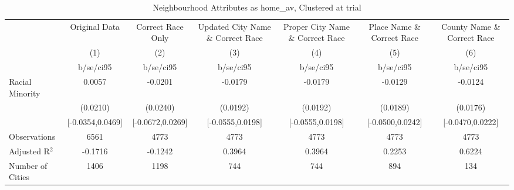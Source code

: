 \documentclass{article}
\begin{document}
\begin{table}[htbp]\centering
\def\sym#1{\ifmmode^{#1}\else\(^{#1}\)\fi}
\caption{Neighbourhood Attributes as home\_av, Clustered at trial}
\begin{tabular}{l*{6}{c}}
\toprule
                    &\multicolumn{1}{c}{Original Data}&\multicolumn{1}{c}{Correct Race Only}&\multicolumn{1}{c}{Updated City Name \& Correct Race}&\multicolumn{1}{c}{Proper City Name \& Correct Race}&\multicolumn{1}{c}{Place Name \& Correct Race}&\multicolumn{1}{c}{County Name \& Correct Race}\\\cmidrule(lr){2-2}\cmidrule(lr){3-3}\cmidrule(lr){4-4}\cmidrule(lr){5-5}\cmidrule(lr){6-6}\cmidrule(lr){7-7}
                    &\multicolumn{1}{c}{(1)}   &\multicolumn{1}{c}{(2)}   &\multicolumn{1}{c}{(3)}   &\multicolumn{1}{c}{(4)}   &\multicolumn{1}{c}{(5)}   &\multicolumn{1}{c}{(6)}   \\
                    &   b/se/ci95   &   b/se/ci95   &   b/se/ci95   &   b/se/ci95   &   b/se/ci95   &   b/se/ci95   \\
\midrule
Racial Minority     &      0.0057   &     -0.0201   &     -0.0179   &     -0.0179   &     -0.0129   &     -0.0124   \\
                    &    (0.0210)   &    (0.0240)   &    (0.0192)   &    (0.0192)   &    (0.0189)   &    (0.0176)   \\
                    &[-0.0354,0.0469]   &[-0.0672,0.0269]   &[-0.0555,0.0198]   &[-0.0555,0.0198]   &[-0.0500,0.0242]   &[-0.0470,0.0222]   \\
\midrule
Observations        &        6561   &        4773   &        4773   &        4773   &        4773   &        4773   \\
Adjusted R$^2$      &     -0.1716   &     -0.1242   &      0.3964   &      0.3964   &      0.2253   &      0.6224   \\
Number of Cities    &        1406   &        1198   &         744   &         744   &         894   &         134   \\
\bottomrule
\end{tabular}
\end{table}
\end{document}
